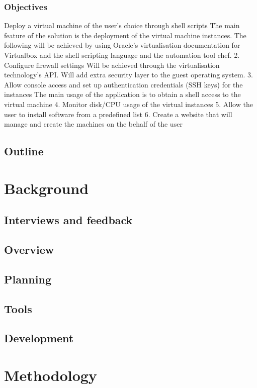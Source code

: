\documentclass{article}
\begin{document}
	  \subsubsection{Objectives}
	  Deploy a virtual machine of the user's choice through shell scripts The main feature of the solution is the deployment of the virtual machine instances. The
	  following will be achieved by using Oracle's virtualisation documentation for Virtualbox and
	  the shell scripting language and the automation tool chef.
	  2. Configure firewall settings
	  Will be achieved through the virtualisation technology's API. Will add extra security layer to
	  the guest operating system.
	  3. Allow console access and set up authentication credentials (SSH keys) for the instances
	  The main usage of the application is to obtain a shell access to the virtual machine
	  4. Monitor disk/CPU usage of the virtual instances
	  5. Allow the user to install software from a predefined list
	  6. Create a website that will manage and create the machines on the behalf of the user
  \subsection{Outline}

  \newpage
  \section{Background}
  \subsection{Interviews and feedback}

  \subsection{Overview}
  \subsection{Planning}
  \subsection{Tools}
  \subsection{Development}
  

  \newpage
  \section{Methodology}
\end{document}
